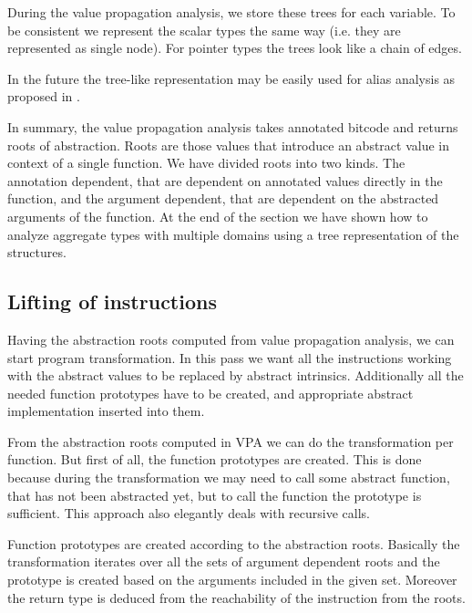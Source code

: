 During the value propagation analysis, we store these trees for each variable.
To be consistent we represent the scalar types the same way (i.e. they are
represented as single node). For pointer types the trees look like a chain of
 edges.

In the future the tree-like representation may be easily used for alias analysis as proposed
in \cite{Rockai15}.


\begin{summary}
In summary, the value propagation analysis takes annotated \LLVM bitcode and
returns roots of abstraction. Roots are those \LLVM values that introduce an
abstract value in context of a single function. We have divided roots into two
kinds. The annotation dependent, that are dependent on annotated values
directly in the function, and the argument dependent, that are dependent
on the abstracted arguments of the function. At the end of the section we
have shown how to analyze aggregate types with multiple domains using a tree
representation of the structures.
\end{summary}

\subsection{Lifting of instructions}
Having the abstraction roots computed from value propagation analysis, we can
start program transformation. In this \LLVM pass we want all the instructions
working with the abstract values to be replaced by abstract intrinsics.
Additionally all the needed function prototypes have to be created, and
appropriate abstract implementation inserted into them.

From the abstraction roots computed in VPA we can do the transformation per
function. But first of all, the function prototypes are created. This is done
because during the transformation we may need to call some abstract function,
that has not been abstracted yet, but to call the function the prototype is
sufficient. This approach also elegantly deals with recursive calls.

Function prototypes are created according to the abstraction roots. Basically
the transformation iterates over all the sets of argument dependent roots and
the prototype is created based on the arguments included in the given set.
Moreover the return type is deduced from the reachability of the  instruction
from the roots.

